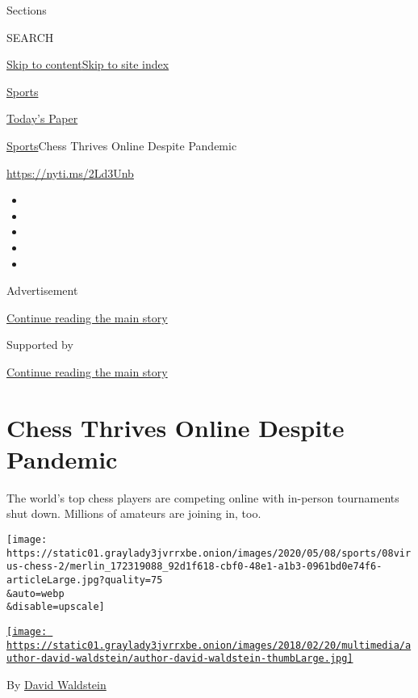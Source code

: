 Sections

SEARCH

\protect\hyperlink{site-content}{Skip to
content}\protect\hyperlink{site-index}{Skip to site index}

\href{https://www.nytimes3xbfgragh.onion/section/sports}{Sports}

\href{https://myaccount.nytimes3xbfgragh.onion/auth/login?response_type=cookie\&client_id=vi}{}

\href{https://www.nytimes3xbfgragh.onion/section/todayspaper}{Today's
Paper}

\href{/section/sports}{Sports}\textbar{}Chess Thrives Online Despite
Pandemic

\url{https://nyti.ms/2Ld3Unb}

\begin{itemize}
\item
\item
\item
\item
\item
\end{itemize}

Advertisement

\protect\hyperlink{after-top}{Continue reading the main story}

Supported by

\protect\hyperlink{after-sponsor}{Continue reading the main story}

\hypertarget{chess-thrives-online-despite-pandemic}{%
\section{Chess Thrives Online Despite
Pandemic}\label{chess-thrives-online-despite-pandemic}}

The world's top chess players are competing online with in-person
tournaments shut down. Millions of amateurs are joining in, too.

\texttt{[image: https://static01.graylady3jvrrxbe.onion/images/2020/05/08/sports/08virus-chess-2/merlin\_172319088\_92d1f618-cbf0-48e1-a1b3-0961bd0e74f6-articleLarge.jpg?quality=75\\\&auto=webp\\\&disable=upscale]}

\href{https://www.nytimes3xbfgragh.onion/by/david-waldstein}{\texttt{[image: https://static01.graylady3jvrrxbe.onion/images/2018/02/20/multimedia/author-david-waldstein/author-david-waldstein-thumbLarge.jpg]}}

By \href{https://www.nytimes3xbfgragh.onion/by/david-waldstein}{David
Waldstein}

